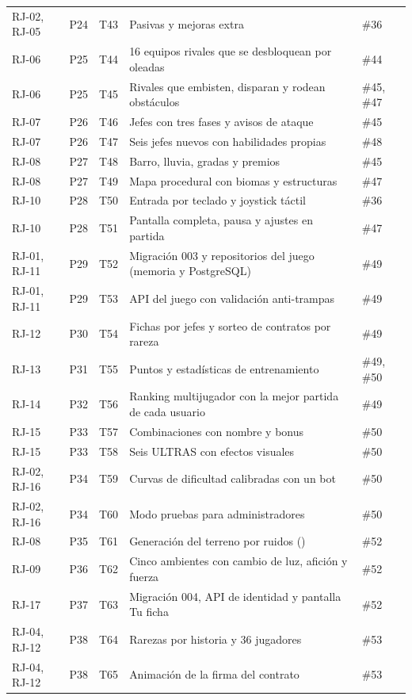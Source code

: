 {\begin{longtable}{@{}L{1.4cm} L{0.7cm} L{1.2cm} L{6.8cm} L{3.2cm}@{}}
RJ-02, RJ-05 & P24 & T43 & Pasivas y mejoras extra & \#36 \\
RJ-06 & P25 & T44 & 16 equipos rivales que se desbloquean por oleadas & \#44 \\
RJ-06 & P25 & T45 & Rivales que embisten, disparan y rodean obstáculos & \#45, \#47 \\
RJ-07 & P26 & T46 & Jefes con tres fases y avisos de ataque & \#45 \\
RJ-07 & P26 & T47 & Seis jefes nuevos con habilidades propias & \#48 \\
RJ-08 & P27 & T48 & Barro, lluvia, gradas y premios & \#45 \\
RJ-08 & P27 & T49 & Mapa procedural con biomas y estructuras & \#47 \\
RJ-10 & P28 & T50 & Entrada por teclado y joystick táctil & \#36 \\
RJ-10 & P28 & T51 & Pantalla completa, pausa y ajustes en partida & \#47 \\
RJ-01, RJ-11 & P29 & T52 & Migración 003 y repositorios del juego (memoria y PostgreSQL) & \#49 \\
RJ-01, RJ-11 & P29 & T53 & API del juego con validación anti-trampas & \#49 \\
RJ-12 & P30 & T54 & Fichas por jefes y sorteo de contratos por rareza & \#49 \\
RJ-13 & P31 & T55 & Puntos y estadísticas de entrenamiento & \#49, \#50 \\
RJ-14 & P32 & T56 & Ranking multijugador con la mejor partida de cada usuario & \#49 \\
RJ-15 & P33 & T57 & Combinaciones con nombre y bonus & \#50 \\
RJ-15 & P33 & T58 & Seis ULTRAS con efectos visuales & \#50 \\
RJ-02, RJ-16 & P34 & T59 & Curvas de dificultad calibradas con un bot & \#50 \\
RJ-02, RJ-16 & P34 & T60 & Modo pruebas para administradores & \#50 \\
RJ-08 & P35 & T61 & Generación del terreno por ruidos () & \#52 \\
RJ-09 & P36 & T62 & Cinco ambientes con cambio de luz, afición y fuerza & \#52 \\
RJ-17 & P37 & T63 & Migración 004, API de identidad y pantalla Tu ficha & \#52 \\
RJ-04, RJ-12 & P38 & T64 & Rarezas por historia y 36 jugadores & \#53 \\
RJ-04, RJ-12 & P38 & T65 & Animación de la firma del contrato & \#53 \\

\end{longtable}}
